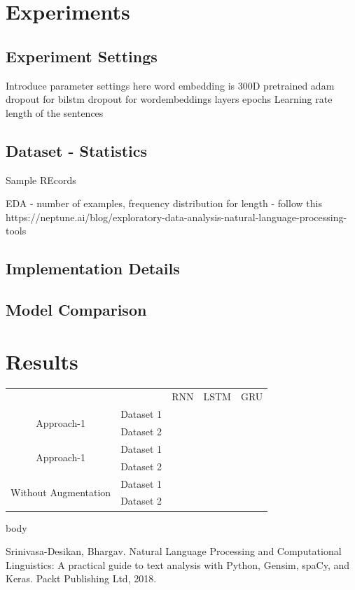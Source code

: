 \documentclass{article}
\begin{document}
\section{Experiments}
\subsection{Experiment Settings}
Introduce parameter settings here
word embedding is 300D pretrained
adam
dropout for bilstm
dropout for wordembeddings
layers
epochs
Learning rate 
length of the sentences
\subsection{Dataset - Statistics}
Sample REcords

EDA - number of examples, frequency distribution for length  - follow this https://neptune.ai/blog/exploratory-data-analysis-natural-language-processing-tools
\subsection{Implementation Details}
\subsection{Model Comparison}

\section{Results}
\begin{table}[]
\begin{tabular}{cllll}
\multicolumn{1}{l}{}                  &           & RNN & LSTM & GRU \\
\multirow{2}{*}{Approach-1}           & Dataset 1 &     &      &     \\
                                      & Dataset 2 &     &      &     \\
\multirow{2}{*}{Approach-1}           & Dataset 1 &     &      &     \\
                                      & Dataset 2 &     &      &     \\
\multirow{2}{*}{Without Augmentation} & Dataset 1 &     &      &     \\
                                      & Dataset 2 &     &      &    
\end{tabular}
\end{table}

body

\begin{thebibliography}{10}

 Srinivasa-Desikan, Bhargav. Natural Language Processing and Computational Linguistics: A practical guide to text analysis with Python, Gensim, spaCy, and Keras. Packt Publishing Ltd, 2018.

\end{thebibliography}
\end{document}

